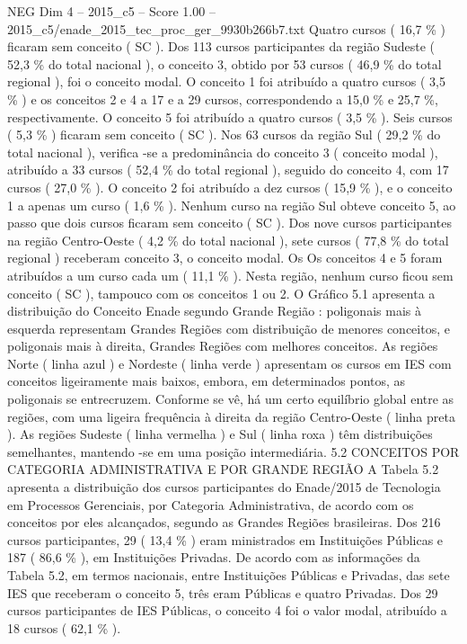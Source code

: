 \begin{textsample}{NEG Dim 4 – 2015\_c5 – Score 1.00 – 2015\_c5/enade\_2015\_tec\_proc\_ger\_9930b266b7.txt}
Quatro cursos ( 16,7 \% ) ficaram sem conceito ( SC ).
Dos 113 cursos participantes da região Sudeste ( 52,3 \% do total nacional ), o conceito 3, obtido por 53 cursos ( 46,9 \% do total regional ), foi o conceito modal.
O conceito 1 foi atribuído a quatro cursos ( 3,5 \% ) e os conceitos 2 e 4 a 17 e a 29 cursos, correspondendo a 15,0 \% e 25,7 \%, respectivamente.
O conceito 5 foi atribuído a quatro cursos ( 3,5 \% ).
Seis cursos ( 5,3 \% ) ficaram sem conceito ( SC ).
Nos 63 cursos da região Sul ( 29,2 \% do total nacional ), verifica -se a predominância do conceito 3 ( conceito modal ), atribuído a 33 cursos ( 52,4 \% do total regional ), seguido do conceito 4, com 17 cursos ( 27,0 \% ).
O conceito 2 foi atribuído a dez cursos ( 15,9 \% ), e o conceito 1 a apenas um curso ( 1,6 \% ).
Nenhum curso na região Sul obteve conceito 5, ao passo que dois cursos ficaram sem conceito ( SC ).
Dos nove cursos participantes na região Centro-Oeste ( 4,2 \% do total nacional ), sete cursos ( 77,8 \% do total regional ) receberam conceito 3, o conceito modal.
Os Os conceitos 4 e 5 foram atribuídos a um curso cada um ( 11,1 \% ).
Nesta região, nenhum curso ficou sem conceito ( SC ), tampouco com os conceitos 1 ou 2.
O Gráfico 5.1 apresenta a distribuição do Conceito Enade segundo Grande Região : poligonais mais à esquerda representam Grandes Regiões com distribuição de menores conceitos, e poligonais mais à direita, Grandes Regiões com melhores conceitos.
As regiões Norte ( linha azul ) e Nordeste ( linha verde ) apresentam os cursos em IES com conceitos ligeiramente mais baixos, embora, em determinados pontos, as poligonais se entrecruzem.
Conforme se vê, há um certo equilíbrio global entre as regiões, com uma ligeira frequência à direita da região Centro-Oeste ( linha preta ).
As regiões Sudeste ( linha vermelha ) e Sul ( linha roxa ) têm distribuições semelhantes, mantendo -se em uma posição intermediária. 5.2 CONCEITOS POR CATEGORIA ADMINISTRATIVA E POR GRANDE REGIÃO A Tabela 5.2 apresenta a distribuição dos cursos participantes do Enade/2015 de Tecnologia em Processos Gerenciais, por Categoria Administrativa, de acordo com os conceitos por eles alcançados, segundo as Grandes Regiões brasileiras.
Dos 216 cursos participantes, 29 ( 13,4 \% ) eram ministrados em Instituições Públicas e 187 ( 86,6 \% ), em Instituições Privadas.
De acordo com as informações da Tabela 5.2, em termos nacionais, entre Instituições Públicas e Privadas, das sete IES que receberam o conceito 5, três eram Públicas e quatro Privadas.
Dos 29 cursos participantes de IES Públicas, o conceito 4 foi o valor modal, atribuído a 18 cursos ( 62,1 \% ).

\end{textsample}
